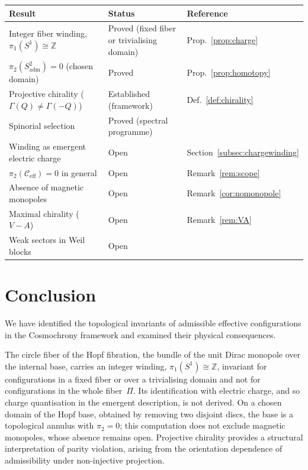 \documentclass[11pt,a4paper]{article}
\newcommand{\Ceff}{\mathcal{C}_{\mathrm{eff}}}
\begin{document}
  \begin{center}
    \begin{tabular}{lll}
      \toprule
      Result & Status & Reference \\
      \midrule
      Integer fiber winding, $\pi_1(S^1) \cong \mathbb{Z}$ &
      Proved (fixed fiber or trivialising domain) &
      Prop.~\ref{prop:charge} \\
      $\pi_2(S^2_{\mathrm{adm}}) = 0$ (chosen domain) &
      Proved &
      Prop.~\ref{prop:homotopy} \\
      Projective chirality ($\Gamma(Q) \neq \Gamma(-Q)$) &
      Established (framework) &
      Def.~\ref{def:chirality} \\
      Spinorial selection &
      Proved (spectral programme) &~\cite{Beau2026a1} \\
      \midrule
      Winding as emergent electric charge &
      Open &
      Section~\ref{subsec:chargewinding} \\
      $\pi_2(\Ceff) = 0$ in general &
      Open &
      Remark~\ref{rem:scope} \\
      Absence of magnetic monopoles &
      Open &
      Remark~\ref{cor:nomonopole} \\
      Maximal chirality ($V{-}A$) &
      Open &
      Remark~\ref{rem:VA} \\
      Weak sectors in Weil blocks &
      Open &~\cite{Beau2026a15} \\
      \bottomrule
    \end{tabular}
  \end{center}

  \section{Conclusion}
  \label{sec:conclusion}

  We have identified the topological invariants of admissible effective
  configurations in the Cosmochrony framework and examined their physical
  consequences.

  The circle fiber of the Hopf fibration, the bundle of the unit Dirac
  monopole over the internal base, carries an integer winding,
  $\pi_1(S^1) \cong \mathbb{Z}$, invariant for configurations in a fixed fiber
  or over a trivialising domain and not for configurations in the whole
  fiber~$\Pi$.
  Its identification with electric charge, and so charge quantisation in the
  emergent description, is not derived.
  On a chosen domain of the Hopf base, obtained by removing two disjoint
  discs, the base is a topological annulus with $\pi_2 = 0$; this
  computation does not exclude magnetic monopoles, whose absence remains
  open.
  Projective chirality provides a structural interpretation of parity
  violation, arising from the orientation dependence of admissibility
  under non-injective projection.
\end{document}

